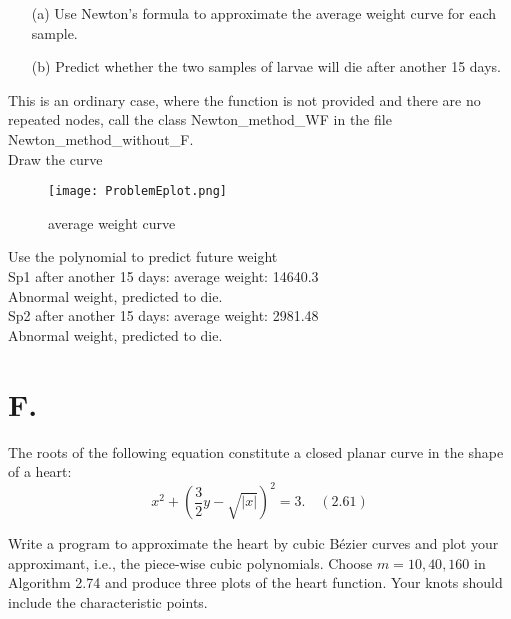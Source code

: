 \documentclass[a4paper]{article}
\begin{document}
    \begin{enumerate}
        \item[(a)] Use Newton's formula to approximate the average weight curve for each sample.
        \item[(b)] Predict whether the two samples of larvae will die after another 15 days.
    \end{enumerate}
    
    This is an ordinary case, where the function is not provided and there are no repeated nodes, call the class Newton\_method\_WF in the file Newton\_method\_without\_F. \\
    Draw the curve \\
    \begin{figure}[H]
        \centering 
        \texttt{[image: ProblemEplot.png]} 
        \caption{average weight curve} 
        \label{fig:example} 
    \end{figure}
    
    Use the polynomial to predict future weight \\
    Sp1 after another 15 days: average weight: 14640.3 \\
    Abnormal weight, predicted to die. \\
    Sp2 after another 15 days: average weight: 2981.48 \\
    Abnormal weight, predicted to die.
    
    \section*{F.}
    The roots of the following equation constitute a closed planar curve in the shape of a heart:
    \[
    x^2 + \left(\frac{3}{2} y - \sqrt{|x|}\right)^2 = 3. \quad (2.61)
    \]
    
    Write a program to approximate the heart by cubic Bézier curves and plot your approximant, i.e., the piece-wise cubic polynomials. Choose $m = 10, 40, 160$ in Algorithm 2.74 and produce three plots of the heart function. Your knots should include the characteristic points.
    
\end{document}
